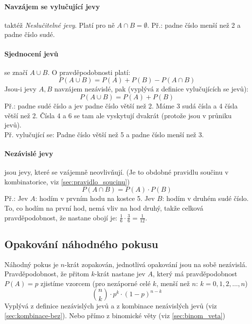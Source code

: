\documentclass[12pt]{article}
\begin{document}
\paragraph{Navzájem se vylučující jevy} taktéž \emph{Neslučitelné jevy}. Platí pro ně $A \cap B = \emptyset$. Př.: padne číslo menší než 2 a padne číslo sudé.
\paragraph{Sjednocení jevů} se značí $A \cup B$. O pravděpodobnosti platí:
\begin{equation}
P(A \cup B) = P(A) + P(B) - P(A \cap B)
\end{equation}
Jsou-i jevy $A,B$ navzájem nezávislé, pak (vyplývá z definice vylučujících se jevů):
\begin{equation}
P(A \cup B) = P(A) + P(B)
\end{equation}
Př.: padne sudé číslo a jev padne číslo větší než 2.  Máme 3 sudá čísla a 4 čísla větší než 2. Čísla 4 a 6 se tam  ale vyskytují dvakrát (protože jsou v průniku jevů).\\
Př. vylučující se: Padne číslo větší než 5 a padne číslo menší než 3.
\paragraph{Nezávislé jevy} jsou jevy, které se vzájemně neovlivňují. (Je to obdobné pravidlu součinu v kombinatorice, viz \ref{sec:pravidlo_soucinu})
\begin{equation}
P(A \cap B) = P(A) \cdot P(B)
\end{equation}
Př.: Jev $A$: hodím v prvním hodu na kostce 5. Jev $B$: hodím v druhém sudé číslo. To, co hodím na první hod, nemá vliv na hod druhý, takže celková pravděpodobnost, že nastane obojí je: $\frac{1}{6} \cdot \frac{3}{6} = \frac{1}{12}$. 
\subsection{Opakování náhodného pokusu}
Náhodný pokus je $n$-krát zopakován, jednotlivá opakování jsou na sobě nezávislá. Pravděpodobnost, že přitom $k$-krát nastane jev $A$, který má pravděpodobnost $P(A) =p$ zjistíme vzorcem (pro nezáporné celé $k$, menší než $n$:  $k =0,1,2, \dotsc, n$)
\begin{equation}
\label{eq:binom_rozdeleni}
\binom{n}{k} \cdot p^k \cdot \left( 1-p \right)^{n-k}
\end{equation}
Vyplývá z definice nezávislých jevů a z kombinace nezávislých jevů (viz \ref{sec:kombinace-bez}). Nebo přímo z binomické věty (viz \ref{sec:binom_veta})
\end{document}
